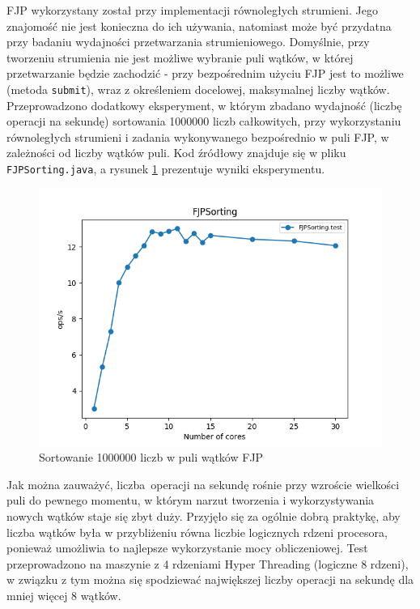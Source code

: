 \documentclass[12pt,twoside,openright]{extarticle}
\begin{document}
    FJP wykorzystany został przy implementacji równoległych strumieni. Jego znajomość nie jest konieczna do ich używania, natomiast może być przydatna przy badaniu wydajności przetwarzania strumieniowego. Domyślnie, przy tworzeniu strumienia nie jest możliwe wybranie puli wątków, w której przetwarzanie będzie zachodzić - przy bezpośrednim użyciu FJP jest to możliwe (metoda \texttt{submit}), wraz z określeniem docelowej, maksymalnej liczby wątków. Przeprowadzono dodatkowy eksperyment, w którym zbadano wydajność (liczbę operacji na sekundę) sortowania 1000000 liczb całkowitych, przy wykorzystaniu równoległych strumieni i zadania wykonywanego bezpośrednio w puli FJP, w zależności od liczby wątków puli. Kod źródłowy znajduje się w pliku \texttt{FJPSorting.java}, a rysunek \ref{fig:fjpsorting} prezentuje wyniki eksperymentu.

\begin{figure}[H]
\centering
\includegraphics[width=13cm]{plots/FJPSorting}
\caption{Sortowanie 1000000 liczb w puli wątków FJP}
\label{fig:fjpsorting}
\end{figure}

    Jak można zauważyć, liczba operacji na sekundę rośnie przy wzroście wielkości puli do pewnego momentu, w którym narzut tworzenia i wykorzystywania nowych wątków staje się zbyt duży. Przyjęło się za ogólnie dobrą praktykę, aby liczba wątków była w przybliżeniu równa liczbie logicznych rdzeni procesora, ponieważ umożliwia to najlepsze wykorzystanie mocy obliczeniowej. Test przeprowadzono na maszynie z 4 rdzeniami Hyper Threading (logiczne 8 rdzeni), w związku z tym można się spodziewać największej liczby operacji na sekundę dla mniej więcej 8 wątków.
\end{document}
